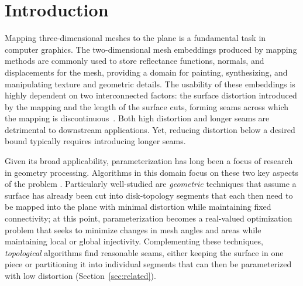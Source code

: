 
\section{Introduction}
Mapping three-dimensional meshes to the plane is a fundamental task in computer graphics.  The two-dimensional mesh embeddings produced by mapping methods are commonly used to store reflectance functions, normals, and displacements
for the mesh, providing a domain for painting, synthesizing, and manipulating texture and geometric details. 
%
The usability of these embeddings is highly dependent on two interconnected factors: the surface distortion introduced by the mapping and the length of the surface cuts, forming seams across which the mapping is discontinuous~\cite{Sheffer07_ParameterizationSurvey,Hormann2008}. Both high distortion and longer seams are detrimental to downstream applications. Yet, reducing distortion below a desired 
bound typically requires introducing longer seams. 

Given its broad applicability, parameterization has long been a focus of research in geometry processing. Algorithms in this domain focus on these two key aspects of the problem \cite{Sheffer07_ParameterizationSurvey,Hormann2008}.  Particularly well-studied are \emph{geometric} techniques that assume a surface has already been cut into disk-topology segments %
 that each then need to be mapped into the plane with minimal distortion while maintaining fixed connectivity; at this point, parameterization becomes a real-valued optimization problem that seeks to minimize changes in mesh angles and areas while maintaining local or global injectivity. Complementing these techniques, \emph{topological} algorithms find reasonable seams, either keeping the surface in one piece or partitioning it into individual segments that can then be parameterized with low distortion (Section~\ref{sec:related}).   

